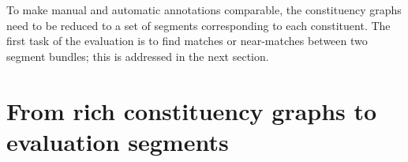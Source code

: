     To make manual and automatic annotations comparable, the constituency graphs need to be reduced to a set of segments corresponding to each constituent. The first task of the evaluation is to find matches or near-matches between two segment bundles; this is addressed in the next section.

\section{From rich constituency graphs to evaluation segments}
\label{sec:segment-alignment}
    




